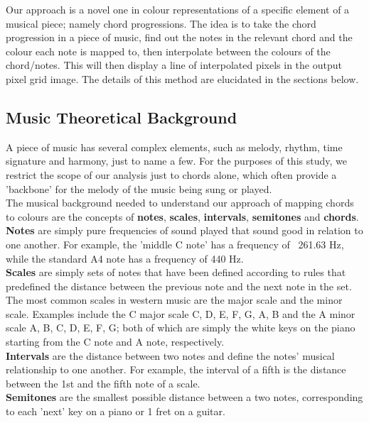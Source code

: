 \documentclass{article}
\begin{document}
Our approach is a novel one in colour representations of a specific element of a musical piece; namely chord progressions. The idea is to take the chord progression in a piece of music, find out the notes in the relevant chord and the colour each note is mapped to, then interpolate between the colours of the chord/notes. This will then display a line of interpolated pixels in the output pixel grid image. The details of this method are elucidated in the sections below.

\subsection{Music Theoretical Background}

A piece of music has several complex elements, such as melody, rhythm, time signature and harmony, just to name a few. For the purposes of this study, we restrict the scope of our analysis just to chords alone, which often provide a 'backbone' for the melody of the music being sung or played.\\

The musical background needed to understand our approach of mapping chords to colours are the concepts of \textbf{notes}, \textbf{scales}, \textbf{intervals}, \textbf{semitones} and \textbf{chords}.\\

\textbf{Notes} are simply pure frequencies of sound played that sound good in relation to one another. For example, the 'middle C note' has a frequency of ~261.63 Hz, while the standard A4 note has a frequency of 440 Hz.\\

\textbf{Scales} are simply sets of notes that have been defined according to rules that predefined the distance between the previous note and the next note in the set. The most common scales in western music are the major scale and the minor scale. Examples include the C major scale {C, D, E, F, G, A, B} and the A minor scale {A, B, C, D, E, F, G}; both of which are simply the white keys on the piano starting from the C note and A note, respectively.\\

\textbf{Intervals} are the distance between two notes and define the notes' musical relationship to one another. For example, the interval of a fifth is the distance between the 1st and the fifth note of a scale.\\

\textbf{Semitones} are the smallest possible distance between a two notes, corresponding to each 'next' key on a piano or 1 fret on a guitar.\\
\end{document}
